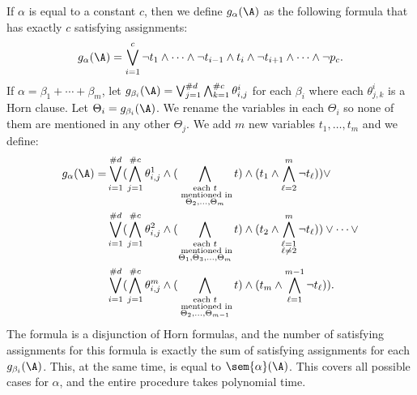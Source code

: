If $\alpha$ is equal to a constant $c$, then we define $g_{\alpha}(\A)$ as the following formula that has exactly $c$ satisfying assignments:
$$
g_{\alpha}(\A) = \bigvee_{i = 1}^{c}\neg t_1 \wedge \cdots \wedge \neg t_{i-1} \wedge t_i \wedge \neg t_{i+1} \wedge \cdots \wedge \neg p_c.
$$ 
If $\alpha = \beta_1 + \cdots + \beta_m$, let $g_{\beta_i}(\A) = \bigvee_{j = 1}^{\#d}\bigwedge_{k = 1}^{\#c}\theta^i_{i,j}$ for each $\beta_i$ where each $\theta^i_{j,k}$ is a Horn clause. Let $\Theta_i = g_{\beta_i}(\A)$. We rename the variables in each $\Theta_i$ so none of them are mentioned in any other $\Theta_j$. We add $m$ new variables $t_1,\ldots,t_m$ and we define:
\begin{align*}
g_{\alpha}(\A) = &\bigvee_{i = 1}^{\#d}(\bigwedge_{j = 1}^{\#c}\theta^1_{i,j} \wedge (\bigwedge\limits_{\substack{\text{each } t\\ \text{ mentioned in}\\ \Theta_2,\ldots,\Theta_{m}}}t) \wedge (t_1 \wedge \bigwedge_{\ell = 2}^{m} \neg t_{\ell})) \vee \\ 
&\bigvee_{i = 1}^{\#d}(\bigwedge_{j = 1}^{\#c}\theta^2_{i,j} \wedge (\bigwedge\limits_{\substack{\text{each $t$}\\ \text{ mentioned in}\\ \Theta_1,\Theta_3,\ldots,\Theta_{m}}}t) \wedge (t_2 \wedge \bigwedge\limits_{\substack{\ell = 1 \\ \ell \neq 2}}^{m} \neg t_{\ell})) \vee \cdots \vee\\ 
&\bigvee_{i = 1}^{\#d}(\bigwedge_{j = 1}^{\#c}\theta^m_{i,j} \wedge (\bigwedge\limits_{\substack{\text{each } t\\ \text{ mentioned in}\\ \Theta_2,\ldots,\Theta_{m-1}}}t) \wedge (t_m \wedge \bigwedge_{\ell = 1}^{m-1} \neg t_{\ell})).
\end{align*}
The formula is a disjunction of Horn formulas, and the number of satisfying assignments for this formula is exactly the sum of satisfying assignments for each $g_{\beta_i}(\A)$. This, at the same time, is equal to $\sem{\alpha}(\A)$. This covers all possible cases for $\alpha$, and the entire procedure takes polynomial time.

